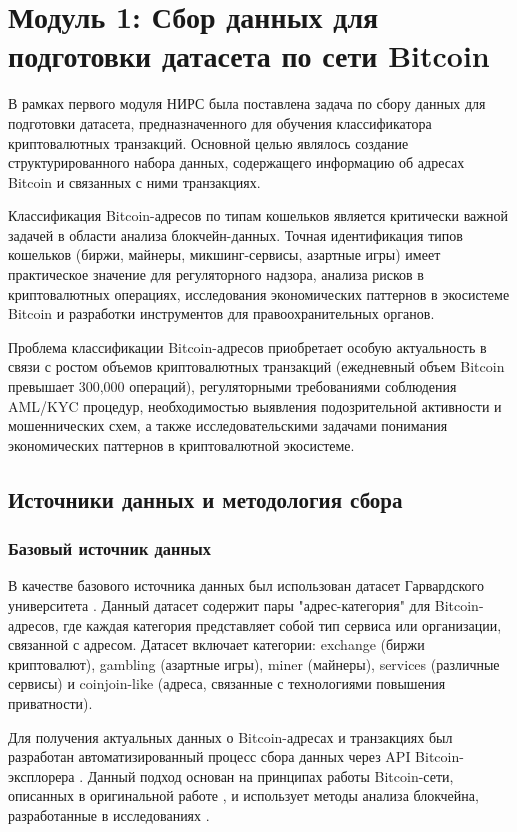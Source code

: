 \section{Модуль 1: Сбор данных для подготовки датасета по сети Bitcoin}
В рамках первого модуля НИРС была поставлена задача по сбору данных для подготовки датасета, предназначенного для обучения классификатора криптовалютных транзакций. Основной целью являлось создание структурированного набора данных, содержащего информацию об адресах Bitcoin и связанных с ними транзакциях.

Классификация Bitcoin-адресов по типам кошельков является критически важной задачей в области анализа блокчейн-данных. Точная идентификация типов кошельков (биржи, майнеры, микшинг-сервисы, азартные игры) имеет практическое значение для регуляторного надзора, анализа рисков в криптовалютных операциях, исследования экономических паттернов в экосистеме Bitcoin и разработки инструментов для правоохранительных органов.

Проблема классификации Bitcoin-адресов приобретает особую актуальность в связи с ростом объемов криптовалютных транзакций (ежедневный объем Bitcoin превышает 300,000 операций), регуляторными требованиями соблюдения AML/KYC процедур, необходимостью выявления подозрительной активности и мошеннических схем, а также исследовательскими задачами понимания экономических паттернов в криптовалютной экосистеме.

\subsection{Источники данных и методология сбора}

\subsubsection{Базовый источник данных}

В качестве базового источника данных был использован датасет Гарвардского университета \cite{harvard_dataset}. Данный датасет содержит пары "адрес-категория" для Bitcoin-адресов, где каждая категория представляет собой тип сервиса или организации, связанной с адресом. Датасет включает категории: exchange (биржи криптовалют), gambling (азартные игры), miner (майнеры), services (различные сервисы) и coinjoin-like (адреса, связанные с технологиями повышения приватности).

Для получения актуальных данных о Bitcoin-адресах и транзакциях был разработан автоматизированный процесс сбора данных через API Bitcoin-эксплорера \cite{bitcoin_explorer_api}\cite{walletexplorer_api}. Данный подход основан на принципах работы Bitcoin-сети, описанных в оригинальной работе \cite{bitcoin_whitepaper}, и использует методы анализа блокчейна, разработанные в исследованиях \cite{blockchain_analysis_survey, bitcoin_privacy_analysis, bitcoin_clustering}.

